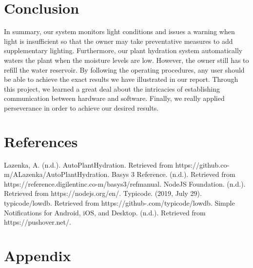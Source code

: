 \documentclass[a4paper]{article}
\begin{document}
\newpage
\section{Conclusion}

In summary, our system monitors light conditions and issues a warning when light is insufficient so that the owner may take preventative measures to add supplementary lighting. Furthermore, our plant hydration system automatically waters the plant when the moisture levels are low. However, the owner still has to refill the water reservoir. By following the operating procedures, any user should be able to achieve the exact results we have illustrated in our report. Through this project, we learned a great deal about the intricacies of establishing communication between hardware and software. Finally, we really applied perseverance in order to achieve our desired results.

\newpage
\section{References}

\begin{thebibliography}{} 
    
    Lazenka, A. (n.d.). AutoPlantHydration. Retrieved from https://github.co-m/ALazenka/AutoPlantHydration.
    Basys 3 Reference. (n.d.). Retrieved from https://reference.digilentinc.co-m/basys3/refmanual.
    NodeJS Foundation. (n.d.). Retrieved from https://nodejs.org/en/.
    Typicode. (2019, July 29). typicode/lowdb. Retrieved from https://github-.com/typicode/lowdb.
    Simple Notifications for Android, iOS, and Desktop. (n.d.). Retrieved from https://pushover.net/.

\end{thebibliography}


\newpage 
    \section{Appendix} 
\end{document}
